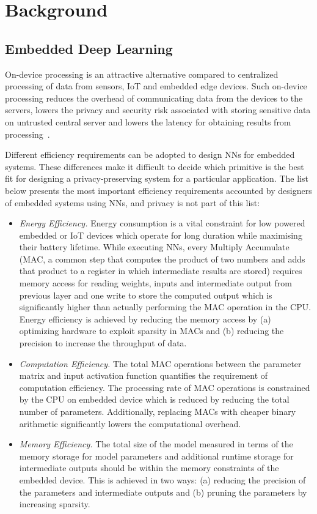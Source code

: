 \section{Background}
\label{background}

\subsection{Embedded Deep Learning}

On-device processing is an attractive alternative compared to centralized processing of data from sensors, IoT and embedded edge devices.
Such on-device processing reduces the overhead of communicating data from the devices to the servers, lowers the privacy and security risk associated with storing sensitive data on untrusted central server and lowers the latency for obtaining results from processing~\cite{8110880}.

Different efficiency requirements can be adopted to design NNs for embedded systems.
These differences make it difficult to decide which primitive is the best fit for designing a privacy-preserving system for a particular application.
The list below presents the most important efficiency requirements accounted by designers of embedded systems using NNs, and privacy is not part of this list:

\begin{itemize}[leftmargin=*]
\item {\em Energy Efficiency.} Energy consumption is a vital constraint for low powered embedded or IoT devices which operate for long duration while maximising their battery lifetime.
While executing NNs, every Multiply Accumulate (MAC, a common step that computes the product of two numbers and adds that product to a register in which intermediate results are stored) requires memory access for reading weights, inputs and intermediate output from previous layer and one write to store the computed output which is significantly higher than actually performing the MAC operation in the CPU.
Energy efficiency is achieved by reducing the memory access by (a) optimizing hardware to exploit sparsity in MACs and (b) reducing the precision to increase the throughput of data.

\item {\em Computation Efficiency.} The total MAC operations between the parameter matrix and input activation function quantifies the requirement of computation efficiency.
The processing rate of MAC operations is constrained by the CPU on embedded device which is reduced by reducing the total number of parameters.
Additionally, replacing MACs with cheaper binary arithmetic significantly lowers the computational overhead.

\item {\em Memory Efficiency.} The total size of the model measured in terms of the memory storage for model parameters and additional runtime storage for intermediate outputs should be within the memory constraints of the embedded device.
This is achieved in two ways: (a) reducing the precision of the parameters and intermediate outputs and (b) pruning the parameters by increasing sparsity.
\end{itemize}


